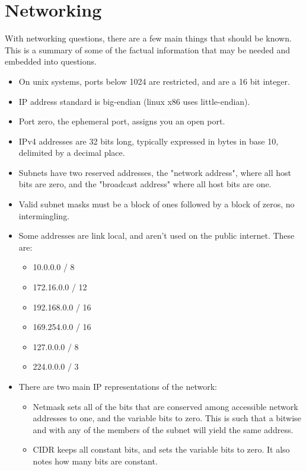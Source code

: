 \documentclass{article}
\begin{document}
\section{Networking}
With networking questions, there are a few main things that should be known. This is a summary of some of the factual information that may be needed and embedded into questions.
\begin{itemize}
    \item On unix systems, ports below 1024 are restricted, and are a 16 bit integer.
    \item IP address standard is big-endian (linux x86 uses little-endian).
    \item Port zero, the ephemeral port, assigns you an open port.
    \item IPv4 addresses are 32 bits long, typically expressed in bytes in base 10, delimited by a decimal place.
    \item Subnets have two reserved addresses, the "network address", where all host bits are zero, and the "broadcast address" where all host bits are one.
    \item Valid subnet masks must be a block of ones followed by a block of zeros, no intermingling.
    \item Some addresses are link local, and aren't used on the public internet. These are:
    \begin{itemize}
        \item 10.0.0.0 / 8
        \item 172.16.0.0 / 12
        \item 192.168.0.0 / 16
        \item 169.254.0.0 / 16
        \item 127.0.0.0 / 8
        \item 224.0.0.0 / 3
    \end{itemize}
    \item There are two main IP representations of the network:
    \begin{itemize}
        \item Netmask sets all of the bits that are conserved among accessible network addresses to one, and the variable bits to zero. This is such that a bitwise and with any of the members of the subnet will yield the same address.
        \item CIDR keeps all constant bits, and sets the variable bits to zero. It also notes how many bits are constant.
    \end{itemize}
\end{itemize}
\end{document}
